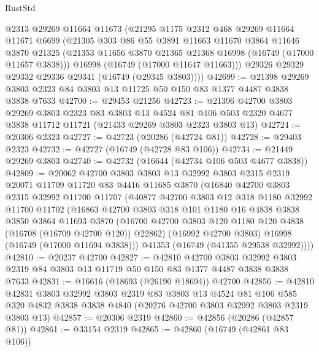 \begin{lexlean}{RustStd}
\begin{coremodule}
      @2313
      @29269
      @11664
      @11673
      (@21295
        @1175
        @2312
        @468
        @29269
        @11664
        @11671
        @6699
        (@21305
          @303
          @86
          @55
          @3891
          @11663
          @11670
          @3864
          @11646
          @3870
          @21325
          (@21353 @11656 @3870 @21365 @21368 @16998 (@16749 (@17000 @11657 @3838)))
          @16998
          (@16749 (@17000 @11647 @11663)))
        @29326
        @29329
        @29332
        @29336
        @29341
        (@16749 (@29345 @3803))))
@42699 := @21398 @29269 @3803 @2323 @84 @3803 @13 @11725 @50 @150 @83 @1377 @4487 @3838 @3838 @7633
@42700 := @29453 @21256
@42723 := @21396
    @42700
    @3803
    @29269
    @3803
    @2323
    @83
    @3803
    @13
    @4524
    @81
    @106
    @503
    @2320
    @4677
    @3838
    @11712
    @11721
    (@21433 @29269 @3803 @2323 @3803 @13)
@42724 := @20306 @2323
@42727 := @42723 (@20286 (@42724 @81))
@42728 := @29403 @2323
@42732 := @42727 (@16749 (@42728 @83 @106))
@42734 := @21449 @29269 @3803
@42740 := @42732 (@16644 (@42734 @106 @503 @4677 @3838))
@42809 := @20062
    @42700
    @3803
    @3803
    @13
    @32992
    @3803
    @2315
    @2319
    @20071
    @11709
    @11720
    @83
    @4416
    @11685
    @3870
    (@16840
      @42700
      @3803
      @2315
      @32992
      @11700
      @11707
      (@40877
        @42700
        @3803
        @12
        @318
        @1180
        @32992
        @11700
        @11702
        (@16863
          @42700
          @3803
          @318
          @101
          @1180
          @16
          @4838
          @3838
          @3850
          @3864
          @11693
          @3870
          (@16700 @42700 @3803 @120 @1180 @120 @4838 (@16708 (@16709 @42700 @120)) @22862)
          (@16992 @42700 @3803)
          @16998
          (@16749 (@17000 @11694 @3838)))
        @41353
        (@16749 (@41355 @29538 @32992))))
@42810 := @20237 @42700
@42827 := @42810
    @42700
    @3803
    @32992
    @3803
    @2319
    @84
    @3803
    @13
    @11719
    @50
    @150
    @83
    @1377
    @4487
    @3838
    @3838
    @7633
@42831 := @16616 (@18693 (@26190 @18694)) @42700
@42856 := @42810
    @42831
    @3803
    @32992
    @3803
    @2319
    @83
    @3803
    @13
    @4524
    @81
    @106
    @585
    @320
    @4832
    @3838
    @3838
    @4840
    (@20276 @42700 @3803 @32992 @3803 @2319 @3803 @13)
@42857 := @20306 @2319
@42860 := @42856 (@20286 (@42857 @81))
@42861 := @33154 @2319
@42865 := @42860 (@16749 (@42861 @83 @106))

\end{coremodule}
\end{lexlean}
